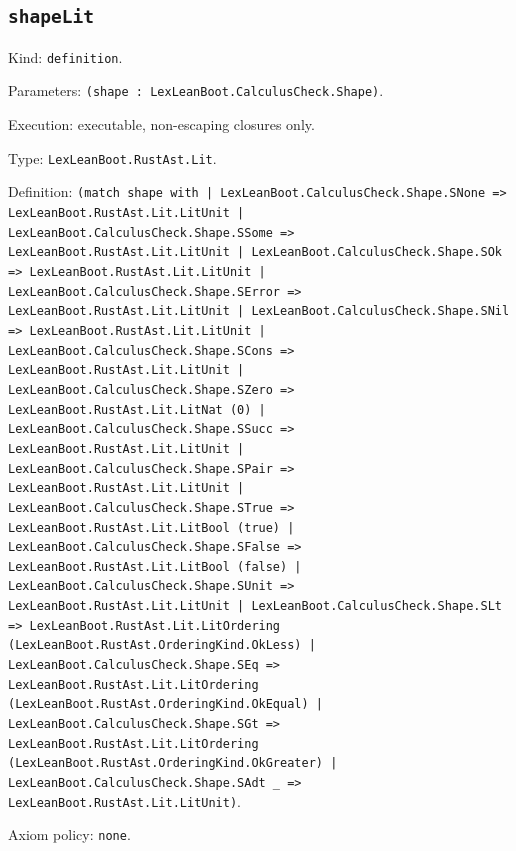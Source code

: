 \documentclass[11pt]{article}
\begin{document}
\subsection*{\texttt{shapeLit}}
\noindent Kind: \texttt{definition}.\par
\noindent Parameters: \texttt{(shape : LexLeanBoot.CalculusCheck.Shape)}.\par
\noindent Execution: executable, non-escaping closures only.\par
\noindent Type: \texttt{LexLeanBoot.RustAst.Lit}.\par
\noindent Definition: \texttt{(match shape with | LexLeanBoot.CalculusCheck.Shape.SNone => LexLeanBoot.RustAst.Lit.LitUnit | LexLeanBoot.CalculusCheck.Shape.SSome => LexLeanBoot.RustAst.Lit.LitUnit | LexLeanBoot.CalculusCheck.Shape.SOk => LexLeanBoot.RustAst.Lit.LitUnit | LexLeanBoot.CalculusCheck.Shape.SError => LexLeanBoot.RustAst.Lit.LitUnit | LexLeanBoot.CalculusCheck.Shape.SNil => LexLeanBoot.RustAst.Lit.LitUnit | LexLeanBoot.CalculusCheck.Shape.SCons => LexLeanBoot.RustAst.Lit.LitUnit | LexLeanBoot.CalculusCheck.Shape.SZero => LexLeanBoot.RustAst.Lit.LitNat (0) | LexLeanBoot.CalculusCheck.Shape.SSucc => LexLeanBoot.RustAst.Lit.LitUnit | LexLeanBoot.CalculusCheck.Shape.SPair => LexLeanBoot.RustAst.Lit.LitUnit | LexLeanBoot.CalculusCheck.Shape.STrue => LexLeanBoot.RustAst.Lit.LitBool (true) | LexLeanBoot.CalculusCheck.Shape.SFalse => LexLeanBoot.RustAst.Lit.LitBool (false) | LexLeanBoot.CalculusCheck.Shape.SUnit => LexLeanBoot.RustAst.Lit.LitUnit | LexLeanBoot.CalculusCheck.Shape.SLt => LexLeanBoot.RustAst.Lit.LitOrdering (LexLeanBoot.RustAst.OrderingKind.OkLess) | LexLeanBoot.CalculusCheck.Shape.SEq => LexLeanBoot.RustAst.Lit.LitOrdering (LexLeanBoot.RustAst.OrderingKind.OkEqual) | LexLeanBoot.CalculusCheck.Shape.SGt => LexLeanBoot.RustAst.Lit.LitOrdering (LexLeanBoot.RustAst.OrderingKind.OkGreater) | LexLeanBoot.CalculusCheck.Shape.SAdt \_ => LexLeanBoot.RustAst.Lit.LitUnit)}.\par
\noindent Axiom policy: \texttt{none}.\par
\end{document}
